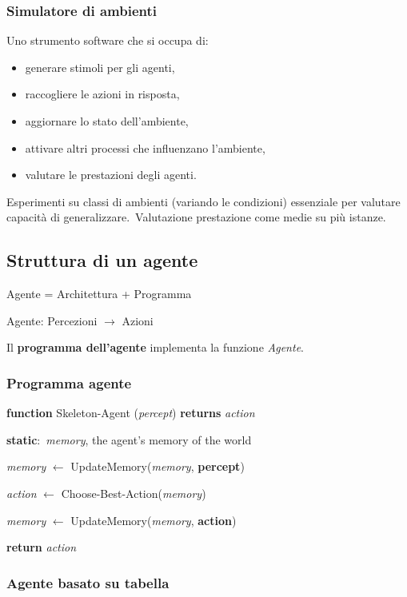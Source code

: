 \subsubsection{Simulatore di ambienti}

Uno strumento software che si occupa di:
\begin{itemize}
	\item generare stimoli per gli agenti,
	\item raccogliere le azioni in risposta,
	\item aggiornare lo stato dell'ambiente,
	\item attivare altri processi che influenzano l'ambiente,
	\item valutare le prestazioni degli agenti.
\end{itemize}
Esperimenti su classi di ambienti (variando le condizioni) essenziale per valutare capacità di generalizzare.\
Valutazione prestazione come medie su più istanze.

\subsection{Struttura di un agente}
Agente = Architettura + Programma

\begin{center}
	Agente: Percezioni $\rightarrow$ Azioni
\end{center}
Il \textbf{programma dell'agente} implementa la funzione \textit{Agente}.

\subsubsection{Programma agente}
\textbf{function} Skeleton-Agent (\textit{percept}) \textbf{returns} \textit{action}

\textbf{static}:\ \textit{memory}, the agent's memory of the world

\textit{memory} $\leftarrow$ UpdateMemory(\textit{memory}, \textbf{percept})

\textit{action} $\leftarrow$ Choose-Best-Action(\textit{memory})

\textit{memory} $\leftarrow$ UpdateMemory(\textit{memory}, \textbf{action})

\textbf{return} \textit{action}

\subsubsection{Agente basato su tabella}

